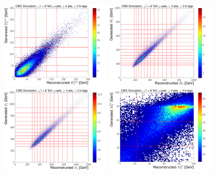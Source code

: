  \begin{figure}[hbtp]
    \centering
     \includegraphics[width=0.48\textwidth]{Chapters/04_Analysis/04b_XSections/images/binning/muon_MET_8TeV.pdf}\hfill
     \includegraphics[width=0.48\textwidth]{Chapters/04_Analysis/04b_XSections/images/binning/muon_HT_8TeV.pdf}\\
     \includegraphics[width=0.48\textwidth]{Chapters/04_Analysis/04b_XSections/images/binning/muon_ST_8TeV.pdf}\hfill
     \includegraphics[width=0.48\textwidth]{Chapters/04_Analysis/04b_XSections/images/binning/muon_MT_8TeV.pdf}\\

\end{figure}
